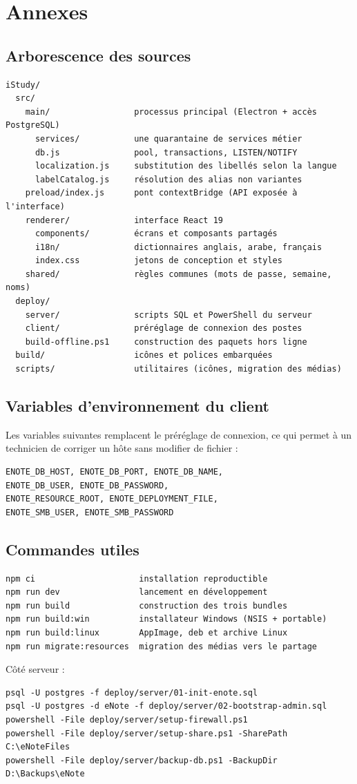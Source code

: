 \chapter{Annexes}

\section{Arborescence des sources}
\begin{verbatim}
iStudy/
  src/
    main/                 processus principal (Electron + accès PostgreSQL)
      services/           une quarantaine de services métier
      db.js               pool, transactions, LISTEN/NOTIFY
      localization.js     substitution des libellés selon la langue
      labelCatalog.js     résolution des alias non variantes
    preload/index.js      pont contextBridge (API exposée à l'interface)
    renderer/             interface React 19
      components/         écrans et composants partagés
      i18n/               dictionnaires anglais, arabe, français
      index.css           jetons de conception et styles
    shared/               règles communes (mots de passe, semaine, noms)
  deploy/
    server/               scripts SQL et PowerShell du serveur
    client/               préréglage de connexion des postes
    build-offline.ps1     construction des paquets hors ligne
  build/                  icônes et polices embarquées
  scripts/                utilitaires (icônes, migration des médias)
\end{verbatim}

\section{Variables d'environnement du client}
Les variables suivantes remplacent le préréglage de connexion, ce qui permet à un technicien de
corriger un hôte sans modifier de fichier :
\begin{verbatim}
ENOTE_DB_HOST, ENOTE_DB_PORT, ENOTE_DB_NAME,
ENOTE_DB_USER, ENOTE_DB_PASSWORD,
ENOTE_RESOURCE_ROOT, ENOTE_DEPLOYMENT_FILE,
ENOTE_SMB_USER, ENOTE_SMB_PASSWORD
\end{verbatim}

\section{Commandes utiles}
\begin{verbatim}
npm ci                     installation reproductible
npm run dev                lancement en développement
npm run build              construction des trois bundles
npm run build:win          installateur Windows (NSIS + portable)
npm run build:linux        AppImage, deb et archive Linux
npm run migrate:resources  migration des médias vers le partage
\end{verbatim}
Côté serveur :
\begin{verbatim}
psql -U postgres -f deploy/server/01-init-enote.sql
psql -U postgres -d eNote -f deploy/server/02-bootstrap-admin.sql
powershell -File deploy/server/setup-firewall.ps1
powershell -File deploy/server/setup-share.ps1 -SharePath C:\eNoteFiles
powershell -File deploy/server/backup-db.ps1 -BackupDir D:\Backups\eNote
\end{verbatim}

